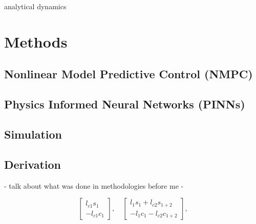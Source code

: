 \documentclass[11pt, titlepage]{article}
\begin{document}



    analytical dynamics


\section{Methods}

\subsection{Nonlinear Model Predictive Control (NMPC)}
\subsection{Physics Informed Neural Networks (PINNs)}
\subsection{Simulation}

    \subsection{Derivation}

    - talk about what was done in methodologies before me
    - 
    
    \begin{equation}
        \begin{bmatrix} l_{c1} s_1 \\ -l_{c1} c_1 \end{bmatrix}, \quad
        \begin{bmatrix} l_1 s_1 + l_{c2} s_{1+2} \\ -l_1 c_1 - l_{c2}
        c_{1+2} \end{bmatrix},
    \end{equation}
\end{document}
